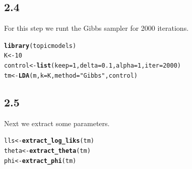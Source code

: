 \documentclass[10pt, a4paper, english]{article}\usepackage[]{graphicx}\usepackage[dvipsnames]{xcolor}
\makeatletter
\newcommand{\hlnum}[1]{\textcolor[rgb]{0.686,0.059,0.569}{#1}}%
\newcommand{\hlstr}[1]{\textcolor[rgb]{0.192,0.494,0.8}{#1}}%
\newcommand{\hlstd}[1]{\textcolor[rgb]{0.345,0.345,0.345}{#1}}%
\newcommand{\hlkwb}[1]{\textcolor[rgb]{0.69,0.353,0.396}{#1}}%
\newcommand{\hlkwc}[1]{\textcolor[rgb]{0.333,0.667,0.333}{#1}}%
\newcommand{\hlkwd}[1]{\textcolor[rgb]{0.737,0.353,0.396}{\textbf{#1}}}%
\newenvironment{kframe}{%
 \def\at@end@of@kframe{}%
 \ifinner\ifhmode%
  \def\at@end@of@kframe{\end{minipage}}%
  \begin{minipage}{\columnwidth}%
 \fi\fi%
 \def\FrameCommand##1{\hskip\@totalleftmargin \hskip-\fboxsep
 \colorbox{shadecolor}{##1}\hskip-\fboxsep
     \hskip-\linewidth \hskip-\@totalleftmargin \hskip\columnwidth}%
 \MakeFramed {\advance\hsize-\width
   \@totalleftmargin\z@ \linewidth\hsize
   \@setminipage}}%
 {\par\unskip\endMakeFramed%
 \at@end@of@kframe}
\newenvironment{knitrout}{}{} %
\makeatother
\begin{document}
\subsection{2.4}
For this step we runt the Gibbs sampler for 2000 iterations.
\begin{knitrout}
\color{fgcolor}\begin{kframe}
\begin{alltt}
\hlkwd{library}\hlstd{(topicmodels)}
\hlstd{K} \hlkwb{<-} \hlnum{10}
\hlstd{control} \hlkwb{<-} \hlkwd{list}\hlstd{(}\hlkwc{keep} \hlstd{=} \hlnum{1}\hlstd{,} \hlkwc{delta} \hlstd{=} \hlnum{0.1}\hlstd{,} \hlkwc{alpha} \hlstd{=} \hlnum{1}\hlstd{,} \hlkwc{iter} \hlstd{=} \hlnum{2000}\hlstd{)}
\hlstd{tm} \hlkwb{<-} \hlkwd{LDA}\hlstd{(m,} \hlkwc{k} \hlstd{= K,} \hlkwc{method} \hlstd{=} \hlstr{"Gibbs"}\hlstd{, control)}
\end{alltt}
\end{kframe}
\end{knitrout}

\subsection{2.5}

Next we extract some parameters.

\begin{knitrout}
\color{fgcolor}\begin{kframe}
\begin{alltt}
\hlstd{lls} \hlkwb{<-} \hlkwd{extract_log_liks}\hlstd{(tm)}
\hlstd{theta} \hlkwb{<-} \hlkwd{extract_theta}\hlstd{(tm)}
\hlstd{phi} \hlkwb{<-} \hlkwd{extract_phi}\hlstd{(tm)}
\end{alltt}
\end{kframe}
\end{knitrout}
\end{document}
